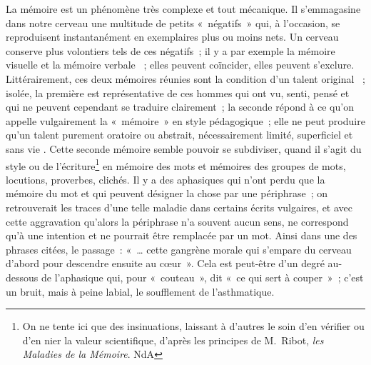\documentclass[french,twoside]{book} %
\begin{document}
La mémoire est un phénomène très complexe et tout mécanique. Il s’emmagasine dans notre cerveau une multitude de petits « négatifs » qui, à l’occasion, se reproduisent instantanément en exemplaires plus ou moins nets. Un cerveau conserve plus volontiers tels de ces négatifs ; il y a par exemple la mémoire visuelle et la mémoire verbale  ; elles peuvent coïncider, elles peuvent s’exclure. Littérairement, ces deux mémoires réunies sont la condition d’un talent original  ; isolée, la première est représentative de ces hommes qui ont vu, senti, pensé et qui ne peuvent cependant se traduire clairement ; la seconde répond à ce qu’on appelle vulgairement la « mémoire » en style pédagogique ; elle ne peut produire qu’un talent purement oratoire ou abstrait, nécessairement limité, superficiel et sans vie . Cette seconde mémoire semble pouvoir se subdiviser, quand il s’agit du style ou de l’écriture\footnote{ On ne tente ici que des insinuations, laissant à d’autres le soin d’en vérifier ou d’en nier la valeur scientifique, d’après les principes de M. Ribot, {\itshape les Maladies de la Mémoire}. NdA} en mémoire des mots et mémoires des groupes de mots, locutions, proverbes, clichés. Il y a des aphasiques qui n’ont perdu que la mémoire du mot et qui peuvent désigner la chose par une périphrase ; on retrouverait les traces d’une telle maladie dans certains écrits vulgaires, et avec cette aggravation qu’alors la périphrase n’a souvent aucun sens, ne correspond qu’à une intention et ne pourrait être remplacée par un mot. Ainsi dans une des phrases citées, le passage : « … cette gangrène morale qui s’empare du cerveau d’abord pour descendre ensuite au cœur ». Cela est peut-être d’un degré au-dessous de l’aphasique qui, pour « couteau », dit « ce qui sert à couper » ; c’est un bruit, mais à peine labial, le soufflement de l’asthmatique.\par
\end{document}
